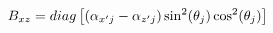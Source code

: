 \vspace{-0.1cm}
\begin{equation}
    B_{xz} = diag\left[(\alpha_{x'j} - \alpha_{z'j})\sin^2(\theta_j)\cos^2(\theta_j)\right]
    \label{eq:rotated_coef3}
    \vspace{-0.05cm}
\end{equation}